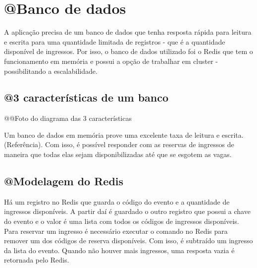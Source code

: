 \section{@Banco de dados}\label{banco-de-dados}

A aplicação precisa de um banco de dados que tenha resposta rápida para leitura e
escrita para uma quantidade limitada de registros - que é a quantidade disponível
de ingressos. Por isso, o banco de dados utilizado foi o Redis que tem o funcionamento
em memória e possui a opção de trabalhar em cluster - possibilitando a escalabilidade.

\subsection{@3 características de um banco}
@@Foto do diagrama das 3 características


Um banco de dados em memória prove uma excelente taxa de leitura e escrita. (Referência).
Com isso, é possível responder com as reservas de ingressos de maneira que todas elas
sejam disponibilizadas até que se esgotem as vagas.

\subsection{@Modelagem do Redis}

Há um registro no Redis que guarda o código do evento e a quantidade de ingressos
disponíveis. A partir daí é guardado o outro registro que possui a chave do evento
e o valor é uma lista com todos os códigos de ingressos disponíveis. Para reservar
um ingresso é necessário executar o comando no Redis para remover um dos códigos
de reserva disponíveis. Com isso, é subtraído um ingresso da lista do evento. Quando
não houver mais ingressos, uma resposta vazia é retornada pelo Redis.

